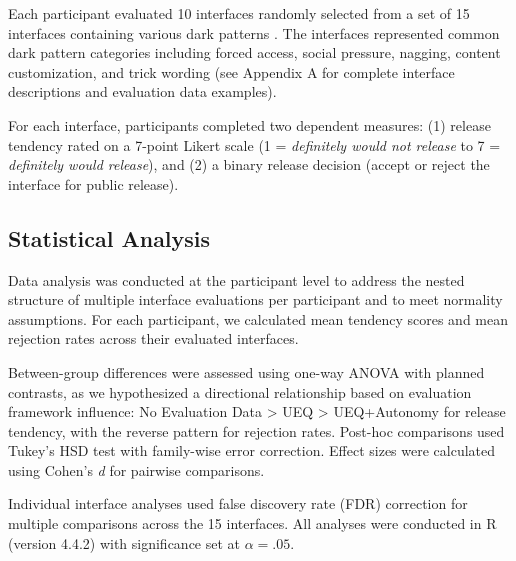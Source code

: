 Each participant evaluated 10 interfaces randomly selected from a set of 15 interfaces containing various dark patterns \cite{gray2018dark}. The interfaces represented common dark pattern categories including forced access, social pressure, nagging, content customization, and trick wording (see Appendix A for complete interface descriptions and evaluation data examples).

For each interface, participants completed two dependent measures: (1) release tendency rated on a 7-point Likert scale (1 = \textit{definitely would not release} to 7 = \textit{definitely would release}), and (2) a binary release decision (accept or reject the interface for public release).

\subsection{Statistical Analysis}

Data analysis was conducted at the participant level to address the nested structure of multiple interface evaluations per participant and to meet normality assumptions. For each participant, we calculated mean tendency scores and mean rejection rates across their evaluated interfaces. 

Between-group differences were assessed using one-way ANOVA with planned contrasts, as we hypothesized a directional relationship based on evaluation framework influence: No Evaluation Data > UEQ > UEQ+Autonomy for release tendency, with the reverse pattern for rejection rates. Post-hoc comparisons used Tukey's HSD test with family-wise error correction. Effect sizes were calculated using Cohen's \textit{d} for pairwise comparisons.

Individual interface analyses used false discovery rate (FDR) correction for multiple comparisons across the 15 interfaces. All analyses were conducted in R (version 4.4.2) with significance set at $\alpha = .05$.
